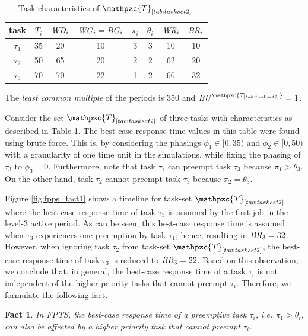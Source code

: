 \documentclass[conference,compsoc]{IEEEtran}
\newtheorem{fact}{Fact}
\newcommand{\bc}    {\mbox{\it BC}}
\newcommand{\br}    {\mbox{\it BR}}
\newcommand{\wc}    {\mbox{\it WC}}
\newcommand{\wcd}   {\mbox{\it WD}}
\renewcommand{\wr}  {\mbox{\it WR}}
\newcommand{\bu}    {\mbox{\it BU}}
\begin{document}
\begin{table}[h]
	\center
	\caption{Task characteristics of $\mathpzc{T}_{\ref{tab:taskset2}}$.}
	\label{tab:taskset2}
	\begin{tabular}{c | c c c c c | c c}
		\hline 
		task & $T_i$ & $\wcd_i$ & $\wc_i=\bc_i$ & $\pi_i$ & $\theta_i$ &  $\wr_i$ & $\br_i$\\ 
		\hline 
		$\tau_1$& 35 & 20 & 10 & 3 & 3 &  10 & 10\\ 
		$\tau_2$& 50 & 65 & 20 & 2 & 2 &  62 & 20\\ 
		$\tau_3$& 70 & 70 & 22 & 1 & 2 &  66 & 32\\
		\hline 
	\end{tabular}
	\small
	\item The \textit{least common multiple} of the periods is 350 and $\bu^{\mathpzc{T_{\ref{tab:taskset2}}}}=1$.
\end{table}

Consider the set $\mathpzc{T}_{\ref{tab:taskset2}}$ of three tasks with characteristics as described in Table \ref{tab:taskset2}. The best-case response time values in this table were found using brute force. This is, by considering the phasings $\phi_1 \in [0,35)$ and $\phi_2 \in [0,50)$ with a granularity of one time unit in the simulations, while fixing the phasing of $\tau_3$ to $\phi_3 = 0$. Furthermore, note that task $\tau_1$ can preempt task $\tau_3$ because $\pi_1 > \theta_3$. On the other hand, task $\tau_2$ cannot preempt task $\tau_3$ because $\pi_2 = \theta_3$. 


Figure \ref{fig:fpps_fact1} shows a timeline for task-set $\mathpzc{T}_{\ref{tab:taskset2}}$ where the best-case response time of task $\tau_3$ is assumed by the first job in the level-3 active period. As can be seen, this best-case response time is assumed when $\tau_3$ experiences one preemption by task $\tau_1$; hence, resulting in $\br_3 = 32$. However, when ignoring task $\tau_2$ from task-set $\mathpzc{T}_{\ref{tab:taskset2}}$, the best-case response time of task $\tau_3$ is reduced to $\br_3 = 22$. Based on this observation, we conclude that, in general, the best-case response time of a task $\tau_i$ is not independent of the higher priority tasks that cannot preempt $\tau_i$. Therefore, we formulate the following fact.

\begin{fact}
	In FPTS, the best-case response time of a preemptive task $\tau_i$, i.e. $\pi_1 > \theta_i$, can also be affected by a higher priority task that cannot preempt $\tau_i$.
\end{fact}
\end{document}
